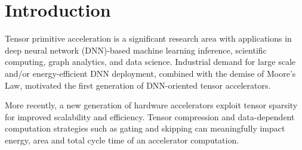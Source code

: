\chapter{Introduction}
\label{chapter:introduction}

Tensor primitive acceleration is a significant research area with applications in deep neural network (DNN)-based machine learning inference\cite{eyeriss}\cite{eyerissv2}\cite{tpu}\cite{extensor}, scientific computing\cite{sci_tensor}, graph analytics\cite{mattson2013standards}, and data science\cite{mcauley2013hidden}\cite{kolda2009tensor}\cite{bader2008discussion}. Industrial demand for large scale\cite{tpu} and/or energy-efficient\cite{eyeriss} DNN deployment, combined with the demise of Moore's Law\cite{moore}, motivated the first generation of DNN-oriented tensor accelerators\cite{eyeriss}\cite{tpu}.

More recently, a new generation of hardware accelerators exploit tensor sparsity for improved scalability and efficiency\cite{ampere}\cite{eyerissv2}\cite{sparten}\cite{sparch}\cite{scnn}\cite{candles}\cite{extensor}. Tensor compression\cite{szebook}\cite{sparseloop}\cite{extensor} and data-dependent computation strategies such as gating and skipping\cite{szebook}\cite{sparseloop} can meaningfully impact energy, area and total cycle time of an accelerator computation\cite{szebook}\cite{sparseloop}.

